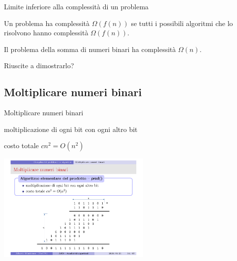 \begin{frame}{Limite inferiore alla complessità di un problema}

\vspace{-9pt}
\begin{myboxtitle}
Un problema ha complessità $\Omega(f(n))$ se tutti i possibili algoritmi che lo risolvono hanno complessità $\Omega(f(n))$.
\end{myboxtitle}

\bigskip
\begin{myboxtitle}
Il problema della somma di numeri binari ha complessità $\Omega(n)$.
\end{myboxtitle}

\begin{myboxtitle}[Domanda]
Riuscite a dimostrarlo?
\end{myboxtitle}

\end{frame}

\subsection{Moltiplicare numeri binari}

\begin{frame}{Moltiplicare numeri binari}

\vspace{-9pt}
\begin{myboxtitle}
\BI
\item moltiplicazione di ogni bit con ogni altro bit
\item costo totale $cn^2 = O(n^2)$
\EI
\end{myboxtitle}

\begin{center}
\includegraphics[width=7.5cm]{multiplication.pdf}
\end{center}

\end{frame}

